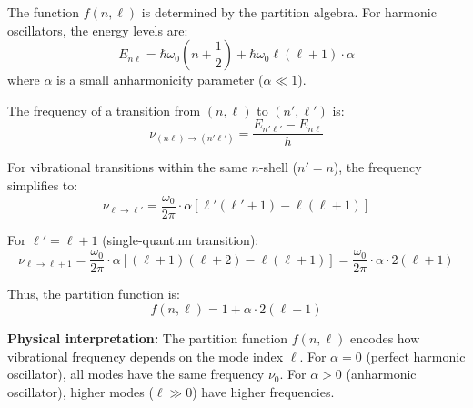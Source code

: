 \documentclass[twocolumn,10pt]{article}
\theoremstyle{remark}
\begin{document}
The function $f(n, \ell)$ is determined by the partition algebra. For harmonic oscillators, the energy levels are:
\begin{equation}
    E_{n\ell} = \hbar \omega_0 \left(n + \frac{1}{2}\right) + \hbar \omega_0 \ell(\ell + 1) \cdot \alpha
    \label{eq:energy_levels_partition}
\end{equation}
where $\alpha$ is a small anharmonicity parameter ($\alpha \ll 1$).

The frequency of a transition from $(n, \ell)$ to $(n', \ell')$ is:
\begin{equation}
    \nu_{(n\ell) \to (n'\ell')} = \frac{E_{n'\ell'} - E_{n\ell}}{h}
    \label{eq:transition_frequency}
\end{equation}

For vibrational transitions within the same $n$-shell ($n' = n$), the frequency simplifies to:
\begin{equation}
    \nu_{\ell \to \ell'} = \frac{\omega_0}{2\pi} \cdot \alpha \left[\ell'(\ell' + 1) - \ell(\ell + 1)\right]
    \label{eq:vibrational_transition}
\end{equation}

For $\ell' = \ell + 1$ (single-quantum transition):
\begin{equation}
    \nu_{\ell \to \ell+1} = \frac{\omega_0}{2\pi} \cdot \alpha \left[(\ell + 1)(\ell + 2) - \ell(\ell + 1)\right] = \frac{\omega_0}{2\pi} \cdot \alpha \cdot 2(\ell + 1)
    \label{eq:single_quantum_transition}
\end{equation}

Thus, the partition function is:
\begin{equation}
    f(n, \ell) = 1 + \alpha \cdot 2(\ell + 1)
    \label{eq:partition_function}
\end{equation}

\textbf{Physical interpretation:} The partition function $f(n, \ell)$ encodes how vibrational frequency depends on the mode index $\ell$. For $\alpha = 0$ (perfect harmonic oscillator), all modes have the same frequency $\nu_0$. For $\alpha > 0$ (anharmonic oscillator), higher modes ($\ell \gg 0$) have higher frequencies.
\end{document}
